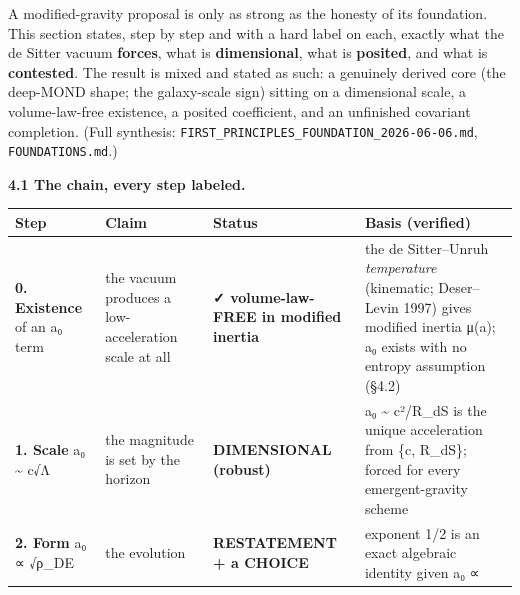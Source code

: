 \documentclass[
]{article}
\newcounter{none} %
\begin{document}
A modified-gravity proposal is only as strong as the honesty of its
foundation. This section states, step by step and with a hard label on
each, exactly what the de Sitter vacuum \textbf{forces}, what is
\textbf{dimensional}, what is \textbf{posited}, and what is
\textbf{contested}. The result is mixed and stated as such: a genuinely
derived core (the deep-MOND shape; the galaxy-scale sign) sitting on a
dimensional scale, a volume-law-free existence, a posited coefficient,
and an unfinished covariant completion. (Full synthesis:
\texttt{FIRST\_PRINCIPLES\_FOUNDATION\_2026-06-06.md},
\texttt{FOUNDATIONS.md}.)

\textbf{4.1 The chain, every step labeled.}

{\def\LTcaptype{none} %
\begin{longtable}[]{@{}
  >{\raggedright\arraybackslash}p{}
  >{\raggedright\arraybackslash}p{}
  >{\raggedright\arraybackslash}p{}
  >{\raggedright\arraybackslash}p{}@{}}
\toprule\noalign{}
\begin{minipage}[b]{\linewidth}\raggedright
Step
\end{minipage} & \begin{minipage}[b]{\linewidth}\raggedright
Claim
\end{minipage} & \begin{minipage}[b]{\linewidth}\raggedright
Status
\end{minipage} & \begin{minipage}[b]{\linewidth}\raggedright
Basis (verified)
\end{minipage} \\
\midrule\noalign{}
\endhead
\bottomrule\noalign{}
\endlastfoot
\textbf{0. Existence} of an a₀ term & the vacuum produces a
low-acceleration scale at all & \textbf{✓ volume-law-FREE in modified
inertia} & the de Sitter--Unruh \emph{temperature} (kinematic;
Deser--Levin 1997) gives modified inertia μ(a); a₀ exists with no
entropy assumption (§4.2) \\
\textbf{1. Scale} a₀ \textasciitilde{} c√Λ & the magnitude is set by the
horizon & \textbf{DIMENSIONAL (robust)} & a₀ \textasciitilde{} c²/R\_dS
is the unique acceleration from \{c, R\_dS\}; forced for every
emergent-gravity scheme \\
\textbf{2. Form} a₀ ∝ √ρ\_DE & the evolution & \textbf{RESTATEMENT + a
CHOICE} & exponent 1/2 is an exact algebraic identity given a₀ ∝

\end{longtable}}
\end{document}
